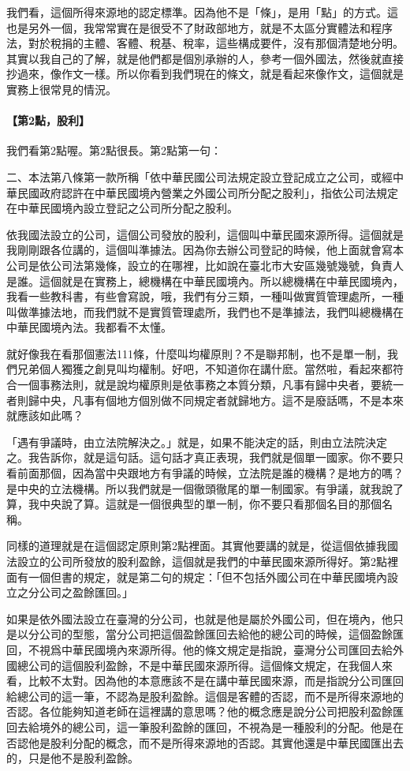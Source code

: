 \documentclass[oneside,sub3section]{ctexbook}
\let\oldparagraph\paragraph
\renewcommand{\paragraph}[1]{\oldparagraph{#1}\mbox{}}
\begin{document}
我們看，這個所得來源地的認定標準。因為他不是「條」，是用「點」的方式。這也是另外一個，我常常實在是很受不了財政部地方，就是不太區分實體法和程序法，對於稅捐的主體、客體、稅基、稅率，這些構成要件，沒有那個清楚地分明。其實以我自己的了解，就是他們都是個別承辦的人，參考一個外國法，然後就直接抄過來，像作文一樣。所以你看到我們現在的條文，就是看起來像作文，這個就是實務上很常見的情況。

\hypertarget{ux7b2c2ux9edeux80a1ux5229}{%
\paragraph{【第2點，股利】}\label{ux7b2c2ux9edeux80a1ux5229}}

我們看第2點喔。第2點很長。第2點第一句：

二、本法第八條第一款所稱「依中華民國公司法規定設立登記成立之公司，或經中華民國政府認許在中華民國境內營業之外國公司所分配之股利」，指依公司法規定在中華民國境內設立登記之公司所分配之股利。

依我國法設立的公司，這個公司發放的股利，這個叫中華民國來源所得。這個就是我剛剛跟各位講的，這個叫準據法。因為你去辦公司登記的時候，他上面就會寫本公司是依公司法第幾條，設立的在哪裡，比如說在臺北市大安區幾號幾號，負責人是誰。這個就是在實務上，總機構在中華民國境內。所以總機構在中華民國境內，我看一些教科書，有些會寫說，哦，我們有分三類，一種叫做實質管理處所，一種叫做準據法地，而我們就不是實質管理處所，我們也不是準據法，我們叫總機構在中華民國境內法。我都看不太懂。

就好像我在看那個憲法111條，什麼叫均權原則？不是聯邦制，也不是單一制，我們兄弟個人獨獲之創見叫均權制。好吧，不知道你在講什麽。當然啦，看起來都符合一個事務法則，就是說均權原則是依事務之本質分類，凡事有歸中央者，要統一者則歸中央，凡事有個地方個別做不同規定者就歸地方。這不是廢話嗎，不是本來就應該如此嗎？

「遇有爭議時，由立法院解決之。」就是，如果不能決定的話，則由立法院決定之。我告訴你，就是這句話。這句話才真正表現，我們就是個單一國家。你不要只看前面那個，因為當中央跟地方有爭議的時候，立法院是誰的機構？是地方的嗎？是中央的立法機構。所以我們就是一個徹頭徹尾的單一制國家。有爭議，就我說了算，我中央說了算。這就是一個很典型的單一制，你不要只看那個名目的那個名稱。

同樣的道理就是在這個認定原則第2點裡面。其實他要講的就是，從這個依據我國法設立的公司所發放的股利盈餘，這個就是我們的中華民國來源所得好。第2點裡面有一個但書的規定，就是第二句的規定：「但不包括外國公司在中華民國境內設立之分公司之盈餘匯回。」

如果是依外國法設立在臺灣的分公司，也就是他是屬於外國公司，但在境內，他只是以分公司的型態，當分公司把這個盈餘匯回去給他的總公司的時候，這個盈餘匯回，不視爲中華民國境內來源所得。他的條文規定是指說，臺灣分公司匯回去給外國總公司的這個股利盈餘，不是中華民國來源所得。這個條文規定，在我個人來看，比較不太對。因為他的本意應該不是在講中華民國來源，而是指說分公司匯回給總公司的這一筆，不認為是股利盈餘。這個是客體的否認，而不是所得來源地的否認。各位能夠知道老師在這裡講的意思嗎？他的概念應是說分公司把股利盈餘匯回去給境外的總公司，這一筆股利盈餘的匯回，不視為是一種股利的分配。他是在否認他是股利分配的概念，而不是所得來源地的否認。其實他還是中華民國匯出去的，只是他不是股利盈餘。
\end{document}
